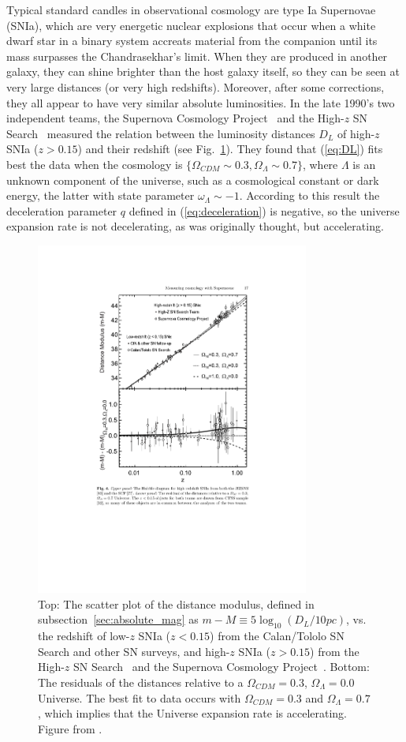Typical standard candles in observational cosmology are type Ia Supernovae (SNIa), which are very energetic nuclear explosions that occur when a white dwarf star in a binary system accreats material from the companion until its mass surpasses the Chandrasekhar's limit. When they are produced in another galaxy, they can shine brighter than the host galaxy itself, so they can be seen at very large distances (or very high redshifts). Moreover, after some corrections, they all appear to have very similar absolute luminosities. In the late 1990’s two independent teams, the Supernova Cosmology Project~\citep{Perlmutter1999} and the High-$z$ SN Search~\citep{Riess1998} measured the relation between the luminosity distances $D_L$ of high-$z$ SNIa ($z>0.15$) and their redshift (see Fig.~\ref{fig:hubble_diagram_sn1a}). They found that (\ref{eq:DL}) fits best the data when the cosmology is $\lbrace \Omega_{CDM} \sim 0.3, \Omega_\Lambda \sim 0.7 \rbrace$, where $\Lambda$ is an unknown component of the universe, such as a cosmological constant or dark energy, the latter with state parameter $\omega_\Lambda \sim -1$. According to this result the deceleration parameter $q$ defined in (\ref{eq:deceleration}) is negative, so the universe expansion rate is not decelerating, as was originally thought, but accelerating.
\begin{figure}
\centering
\includegraphics[width=90mm]{./plots/perlmutter_riess_hubble_diagram.pdf}
\caption{Top: The scatter plot of the distance modulus, defined in subsection~\ref{sec:absolute_mag} as $m-M \equiv 5\log_{10}(D_L / 10pc)$, vs. the redshift of low-$z$ SNIa ($z<0.15$) from the Calan/Tololo SN Search \citep{Hamuy1993} and other SN surveys, and high-$z$ SNIa ($z>0.15$) from the High-$z$ SN Search~\citep{Riess1998} and the Supernova Cosmology Project~\citep{Perlmutter1999}. Bottom: The residuals of the distances relative to a $\Omega_{CDM}=0.3$, $\Omega_\Lambda=0.0$ Universe. The best fit to data occurs with $\Omega_{CDM}=0.3$ and $\Omega_\Lambda=0.7$, which implies that the Universe expansion rate is accelerating. Figure from \citet{Perlmutter2003}.}
\label{fig:hubble_diagram_sn1a}
\end{figure}

